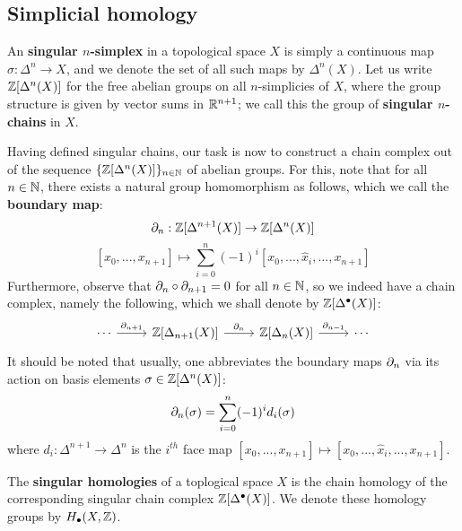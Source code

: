     	 \subsection{Simplicial homology}   
    	    \begin{definition} \label{def: singular_simplices}
                An \textbf{singular $n$-simplex} in a topological space $X$ is simply a continuous map $\sigma: \Delta^n \to X$, and we denote the set of all such maps by $\Delta^n(X)$. Let us write $\mathbb{Z}[\Delta^n(X)]$ for the free abelian groups on all $n$-simplicies of $X$, where the group structure is given by vector sums in $\mathbb{R}^{n + 1}$; we call this the group of \textbf{singular $n$-chains} in $X$.
    	    \end{definition}
    	    \begin{remark}
                Having defined singular chains, our task is now to construct a chain complex out of the sequence $\{\mathbb{Z}[\Delta^n(X)]\}_{n \in \mathbb{N}}$ of abelian groups. For this, note that for all $n \in \mathbb{N}$, there exists a natural group homomorphism as follows, which we call the \textbf{boundary map}: 
                    $$\partial_n: \mathbb{Z}[\Delta^{n + 1}(X)] \to \mathbb{Z}[\Delta^n(X)]$$
                    $$[x_0, ..., x_{n + 1}] \mapsto \sum_{i = 0}^n (-1)^i [x_0, ..., \hat{x}_i, ..., x_{n + 1}]$$
                Furthermore, observe that $\partial_n \circ \partial_{n + 1} = 0$ for all $n \in \mathbb{N}$, so we indeed have a chain complex, namely the following, which we shall denote by $\mathbb{Z}[\Delta^{\bullet}(X)]$:
                    $$
                        \begin{tikzcd}
                        	\cdots & {\Z[\Delta_{n + 1}(X)]} & {\Z[\Delta_n(X)]} & \cdots
                        	\arrow["{\del_{n + 1}}", from=1-1, to=1-2]
                        	\arrow["{\del_n}", from=1-2, to=1-3]
                        	\arrow["{\del_{n - 1}}", from=1-3, to=1-4]
                        \end{tikzcd}
                    $$
                It should be noted that usually, one abbreviates the boundary maps $\partial_n$ via its action on basis elements $\sigma \in \mathbb{Z}[\Delta^n(X)]$:
                    $$\partial_n(\sigma) = \sum_{i = 0}^n (-1)^i d_i(\sigma)$$
                where $d_i: \Delta^{n + 1} \to \Delta^n$ is the $i^{th}$ face map $[x_0, ..., x_{n + 1}] \mapsto [x_0, ..., \hat{x}_i, ..., x_{n + 1}]$. 
    	    \end{remark}
    	    \begin{definition} \label{def: singular_homology}
                The \textbf{singular homologies} of a toplogical space $X$ is the chain homology of the corresponding singular chain complex $\mathbb{Z}[\Delta^{\bullet}(X)]$. We denote these homology groups by $H_{\bullet}(X, \mathbb{Z})$.
    	    \end{definition}
